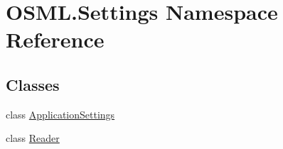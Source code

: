 \hypertarget{namespaceOSML_1_1Settings}{}\section{O\+S\+M\+L.\+Settings Namespace Reference}
\label{namespaceOSML_1_1Settings}
\subsection*{Classes}
\begin{DoxyCompactItemize}
\item 
class \mbox{\hyperlink{classOSML_1_1Settings_1_1ApplicationSettings}{Application\+Settings}}
\item 
class \mbox{\hyperlink{classOSML_1_1Settings_1_1Reader}{Reader}}
\end{DoxyCompactItemize}
